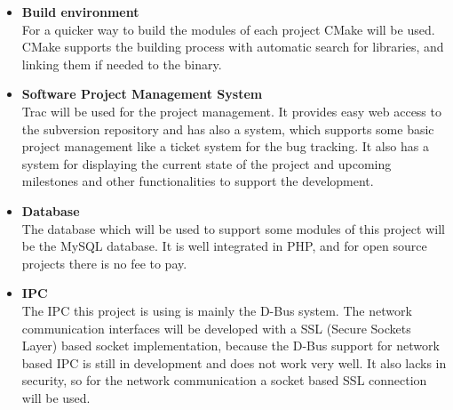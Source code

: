 \begin{itemize}
   \item \textbf{Build environment}\\
    For a quicker way to build the modules of each project CMake will be used. CMake supports the building process with automatic search for libraries, and linking them if needed to the binary.
   \item \textbf{Software Project Management System}\\
    Trac will be used for the project management. It provides easy web access to the subversion repository and has also a system, which supports some basic project management like a ticket system for the bug tracking. It also has a system for displaying the current state of the project and upcoming milestones and other functionalities to support the development.
   \item \textbf{Database}\\
    The database which will be used to support some modules of this project will be the MySQL database. It is well integrated in PHP, and for open source projects there is no fee to pay.
   \item \textbf{IPC}\\
    The IPC this project is using is mainly the D-Bus system. The network communication interfaces will be developed with a SSL (Secure Sockets Layer) based socket implementation, because the D-Bus support for network based IPC is still in development and does not work very well. It also lacks in security, so for the network communication a socket based SSL connection will be used.
  \end{itemize}

